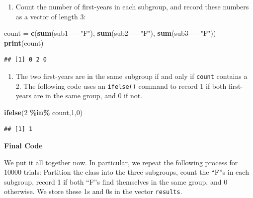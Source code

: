 \documentclass[
]{book}
\newenvironment{Shaded}{\begin{snugshade}}{\end{snugshade}}
\newcommand{\DecValTok}[1]{\textcolor[rgb]{0.00,0.00,0.81}{#1}}
\newcommand{\FunctionTok}[1]{\textcolor[rgb]{0.13,0.29,0.53}{\textbf{#1}}}
\newcommand{\NormalTok}[1]{#1}
\newcommand{\OtherTok}[1]{\textcolor[rgb]{0.56,0.35,0.01}{#1}}
\newcommand{\SpecialCharTok}[1]{\textcolor[rgb]{0.81,0.36,0.00}{\textbf{#1}}}
\newcommand{\StringTok}[1]{\textcolor[rgb]{0.31,0.60,0.02}{#1}}
\providecommand{\tightlist}{%
  \setlength{\itemsep}{0pt}\setlength{\parskip}{0pt}}
\theoremstyle{definition}
\theoremstyle{definition}
\theoremstyle{definition}
\theoremstyle{definition}
\theoremstyle{remark}
\begin{document}
\begin{enumerate}
\def\labelenumi{\arabic{enumi}.}
\setcounter{enumi}{2}
\tightlist
\item
  Count the number of first-years in each subgroup, and record these numbers as a vector of length 3:
\end{enumerate}

\begin{Shaded}
\begin{Highlighting}[]
\NormalTok{count }\OtherTok{=} \FunctionTok{c}\NormalTok{(}\FunctionTok{sum}\NormalTok{(sub1}\SpecialCharTok{==}\StringTok{"F"}\NormalTok{),}
            \FunctionTok{sum}\NormalTok{(sub2}\SpecialCharTok{==}\StringTok{"F"}\NormalTok{),}
            \FunctionTok{sum}\NormalTok{(sub3}\SpecialCharTok{==}\StringTok{"F"}\NormalTok{))}
\FunctionTok{print}\NormalTok{(count)}
\end{Highlighting}
\end{Shaded}

\begin{verbatim}
## [1] 0 2 0
\end{verbatim}

\begin{enumerate}
\def\labelenumi{\arabic{enumi}.}
\setcounter{enumi}{3}
\tightlist
\item
  The two first-years are in the same subgroup if and only if \texttt{count} contains a 2. The following code uses an \texttt{ifelse()} command to record 1 if both first-years are in the same group, and 0 if not.
\end{enumerate}

\begin{Shaded}
\begin{Highlighting}[]
\FunctionTok{ifelse}\NormalTok{(}\DecValTok{2} \SpecialCharTok{\%in\%}\NormalTok{ count,}\DecValTok{1}\NormalTok{,}\DecValTok{0}\NormalTok{)}
\end{Highlighting}
\end{Shaded}

\begin{verbatim}
## [1] 1
\end{verbatim}

\textbf{Final Code}

We put it all together now. In particular, we repeat the following process for 10000 trials: Partition the class into the three subgroups, count the ``F''s in each subgroup, record 1 if both ``F''s find themselves in the same group, and 0 otherwise. We store these 1s and 0s in the vector \texttt{results}.
\end{document}
